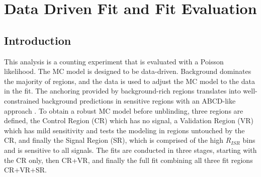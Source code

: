 \setcounter{secnumdepth}{3}
\setcounter{tocdepth}{3}
\setlength{\parskip}{\smallskipamount}
\setlength{\parindent}{0pt}


\makeatletter


\providecommand{\tabularnewline}{\\}


\makeatother

\chapter{Data Driven Fit and Fit Evaluation}

\section{Introduction}
This analysis is a counting experiment that is evaluated with a Poisson likelihood. The MC model is designed to be data-driven. Background dominates the majority of regions, and the data is used to adjust the MC model to the data in the fit. The anchoring provided by background-rich regions translates into well-constrained background predictions in sensitive regions with an ABCD-like approach \cite{abcd}. To obtain a robust MC model before unblinding, three regions are defined, the Control Region (CR) which has no signal, a Validation Region (VR) which has mild sensitivity and tests the modeling in regions untouched by the CR, and finally the Signal Region (SR), which is comprised of the high $R_{ISR}$ bins and is sensitive to all signals. The fits are conducted in three stages, starting with the CR only, then CR+VR, and finally the full fit combining all three fit regions CR+VR+SR.

